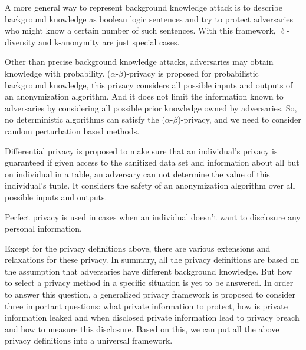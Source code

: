 \documentclass[12pt]{article}
\begin{document}
A more general way to represent background knowledge attack is to
describe background knowledge as boolean logic sentences and try to
protect adversaries who might know a certain number of such
sentences. With this framework, $\ell$-diversity and k-anonymity are
just special cases. 

Other than precise background knowledge attacks, adversaries may
obtain knowledge with probability. ($\alpha$-$\beta$)-privacy is proposed
for probabilistic background knowledge, this privacy considers all
possible inputs and outputs of an anonymization algorithm. And it does
not limit the information known to adversaries by considering all
possible prior knowledge owned by adversaries. So, no deterministic
algorithms can satisfy the ($\alpha$-$\beta$)-privacy, and we need to
consider random perturbation based methods. 

Differential privacy is proposed to make sure that an individual's
privacy is guaranteed if given access to the sanitized data set and
information about all but on individual in a table, an adversary can
not determine the value of this individual's tuple. It considers the
safety of an anonymization algorithm over all possible inputs and
outputs. 

Perfect privacy is used in cases when an individual doesn't want to
disclosure any personal information. 

Except for the privacy definitions above, there are various extensions
and relaxations for these privacy. In summary, all the privacy
definitions are based on the assumption that adversaries have
different background knowledge. But how to select a privacy method in
a specific situation is yet to be answered. In order to answer this
question, a generalized privacy framework is proposed to consider
three important questions: what private information to protect, how is
private information leaked and when disclosed private information lead
to privacy breach and how to measure this disclosure. Based on this,
we can put all the above privacy definitions into a universal
framework. 
\end{document}
